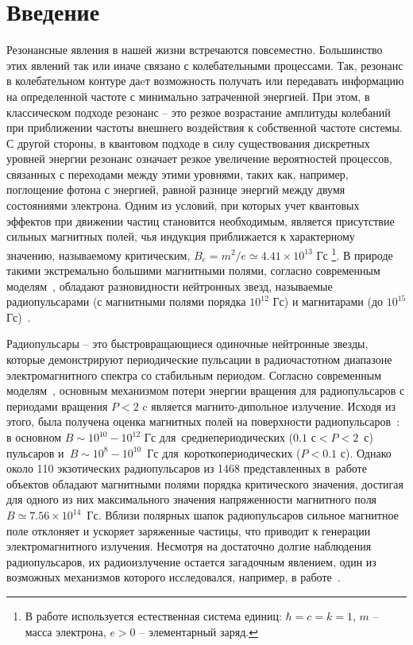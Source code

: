 \section{Введение}
Резонансные явления в нашей жизни встречаются повсеместно. Большинство этих явлений так или иначе связано с колебательными процессами. Так, резонанс в колебательном контуре даeт возможность получать или передавать информацию 
на определенной частоте с минимально затраченной энергией. При этом, в 
классическом подходе резонанс -- это резкое возрастание амплитуды колебаний при 
приближении частоты внешнего воздействия к собственной частоте системы. С 
другой стороны, в квантовом подходе в силу существования дискретных уровней 
энергии резонанс означает резкое увеличение вероятностей процессов, связанных с 
переходами между этими уровнями, таких как, например, поглощение фотона с 
энергией, равной разнице энергий между двумя состояниями электрона. Одним из 
условий, при которых учет квантовых эффектов при движении частиц становится 
необходимым, является присутствие сильных магнитных полей, чья индукция 
приближается к характерному значению, называемому критическим, $B_e = m^2 / e 
\simeq 4.41 \times 10^{13}$ Гс \footnote{В работе используется естественная 
система единиц: $\hbar = c = k = 1$, $m$ -- масса электрона, $e > 0$ --  
элементарный заряд.}. В природе такими экстремально большими магнитными полями, 
согласно современным моделям~\cite{Duncan:1995,Thompson:1996,Thompson:2002}, 
обладают разновидности нейтронных звезд, называемые радиопульсарами (с 
магнитными полями порядка $10^{12}$ Гс) и магнитарами (до $10^{15}$ 
Гс)~\cite{McGill:Cite}.


Радиопульсары -- это быстровращающиеся одиночные нейтронные 
звезды, которые демонстрируют периодические пульсации в радиочастотном 
диапазоне электромагнитного спектра со стабильным периодом. Согласно 
современным моделям~\cite{Gunn:1969,Pacini:1970}, основным механизмом потери 
энергии вращения для радиопульсаров с периодами вращения $P<2$ c является 
магнито-дипольное излучение. Исходя из этого, была получена оценка магнитных 
полей на поверхности радиопульсаров~\cite{Kim:2023}: в основном $B\sim 10^{10}-10^{12}$ Гс для~среднепериодических ($0.1\text{ с}<P<2$~с) пульсаров и~$B\sim10^8-10^{10}$~Гс для~короткопериодических ($P<0.1$ с). Однако около 110 экзотических радиопульсаров из 1468 представленных в~работе~\cite{Kim:2023} объектов обладают магнитными полями 
порядка критического значения, достигая для одного из них максимального 
значения напряженности магнитного поля $B\simeq7.56 \times 10^{14}$~Гс. Вблизи 
полярных шапок радиопульсаров сильное магнитное поле отклоняет и ускоряет 
заряженные частицы, что приводит к генерации электромагнитного излучения.    
Несмотря на достаточно долгие наблюдения радиопульсаров, их радиоизлучение 
остается загадочным явлением, один из возможных механизмов которого 
исследовался, например, в работе~\cite{Philippov_2020}.
	
